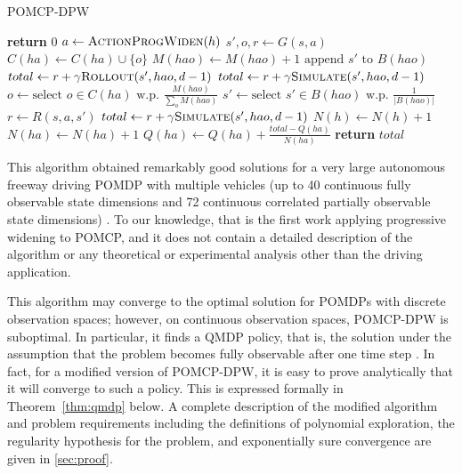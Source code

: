 \setcounter{algorithm}{0}
\begin{algorithm}[htbp]
    \caption{POMCP-DPW} \label{alg:pomcpdpw}
    \begin{algorithmic}[1]
                \State \textbf{return} $0$
            \EndIf
            \State $a \gets \Call{ActionProgWiden}{h}$
                \State $s',o,r \gets G(s,a)$
                \State $C(ha) \gets C(ha) \cup \{o\}$
                \State $M(hao) \gets M(hao) + 1$
                \State $\text{append } s' \text{ to } B(hao)$ \label{lin:insertion}
                    \State $total \gets r + \gamma \Call{Rollout}{s', hao, d-1}$
                \Else
                    \State $total \gets r + \gamma \Call{Simulate}{s', hao, d-1}$
                \EndIf
            \Else \label{lin:notnew}
                \State $o \gets \text{select } o \in C(ha) \text{ w.p. } \frac{M(hao)}{\sum_{o} M(hao)}$ \label{lin:selecto}
                \State $s' \gets \text{select } s' \in B(hao) \text{ w.p. } \frac{1}{|B(hao)|}$ \label{lin:samples}
                \State $r \gets R(s,a,s')$
                \State $total \gets r + \gamma \Call{Simulate}{s', hao, d-1}$
            \EndIf
            \State $N(h) \gets N(h)+1$
            \State $N(ha) \gets N(ha)+1$
            \State $Q(ha) \gets Q(ha) + \frac{total - Q(ha)}{N(ha)}$
            \State \textbf{return} $total$
        \EndProcedure
    \end{algorithmic}
\end{algorithm}

This algorithm obtained remarkably good solutions for a very large autonomous freeway driving POMDP with multiple vehicles (up to 40 continuous fully observable state dimensions and 72 continuous correlated partially observable state dimensions) \cite{sunberg2017value}.
To our knowledge, that is the first work applying progressive widening to POMCP, and it does not contain a detailed description of the algorithm or any theoretical or experimental analysis other than the driving application.

This algorithm may converge to the optimal solution for POMDPs with discrete observation spaces; however, on continuous observation spaces, POMCP-DPW is suboptimal.
In particular, it finds a QMDP policy, that is, the solution under the assumption that the problem becomes fully observable after one time step \cite{littman1995learning,kochenderfer2015decision}.
In fact, for a modified version of POMCP-DPW, it is easy to prove analytically that it will converge to such a policy.
This is expressed formally in Theorem~\ref{thm:qmdp} below.
A complete description of the modified algorithm and problem requirements including the definitions of polynomial exploration, the regularity hypothesis for the problem, and exponentially sure convergence are given in \cref{sec:proof}.

